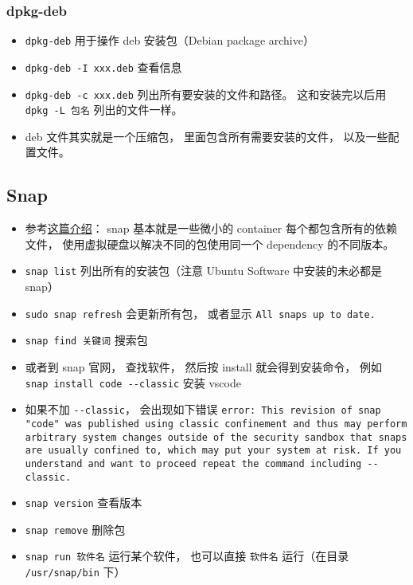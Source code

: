 \subsubsection{dpkg-deb}
\begin{itemize}
\item \verb|dpkg-deb| 用于操作 deb 安装包（Debian package archive）
\item \verb|dpkg-deb -I xxx.deb| 查看信息
\item \verb|dpkg-deb -c xxx.deb| 列出所有要安装的文件和路径。 这和安装完以后用 \verb|dpkg -L 包名| 列出的文件一样。
\item deb 文件其实就是一个压缩包， 里面包含所有需要安装的文件， 以及一些配置文件。
\end{itemize}


\subsection{Snap}
\begin{itemize}
\item 参考\href{https://www.howtogeek.com/660193/how-to-work-with-snap-packages-on-linux/}{这篇介绍}： snap 基本就是一些微小的 container 每个都包含所有的依赖文件， 使用虚拟硬盘以解决不同的包使用同一个 dependency 的不同版本。
\item \verb|snap list| 列出所有的安装包（注意 Ubuntu Software 中安装的未必都是 snap）
\item \verb|sudo snap refresh| 会更新所有包， 或者显示 \verb|All snaps up to date.|
\item \verb|snap find 关键词| 搜索包
\item 或者到 snap 官网， 查找软件， 然后按 install 就会得到安装命令， 例如 \verb|snap install code --classic| 安装 vscode
\item 如果不加 \verb|--classic|， 会出现如下错误 \verb|error: This revision of snap "code" was published using classic confinement and thus may perform arbitrary system changes outside of the security sandbox that snaps are usually confined to, which may put your system at risk. If you understand and want to proceed repeat the command including --classic.|
\item \verb|snap version| 查看版本
\item \verb|snap remove| 删除包
\item \verb|snap run 软件名| 运行某个软件， 也可以直接 \verb|软件名| 运行（在目录 \verb|/usr/snap/bin| 下）
\end{itemize}

